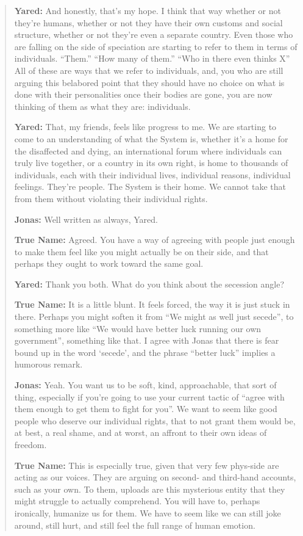 \begin{quote}
\textbf{Yared:} And honestly, that's my hope. I think that way whether or not they're humans, whether or not they have their own customs and social structure, whether or not they're even a separate country. Even those who are falling on the side of speciation are starting to refer to them in terms of individuals. ``Them.'' ``How many of them.'' ``Who in there even thinks X'' All of these are ways that we refer to individuals, and, you who are still arguing this belabored point that they should have no choice on what is done with their personalities once their bodies are gone, you are now thinking of them as what they are: individuals.

\textbf{Yared:} That, my friends, feels like progress to me. We are starting to come to an understanding of what the System is, whether it's a home for the disaffected and dying, an international forum where individuals can truly live together, or a country in its own right, is home to thousands of individuals, each with their individual lives, individual reasons, individual feelings. They're people. The System is their home. We cannot take that from them without violating their individual rights.

\textbf{Jonas:} Well written as always, Yared.

\textbf{True Name:} Agreed. You have a way of agreeing with people just enough to make them feel like you might actually be on their side, and that perhaps they ought to work toward the same goal.

\textbf{Yared:} Thank you both. What do you think about the secession angle?

\textbf{True Name:} It is a little blunt. It feels forced, the way it is just stuck in there. Perhaps you might soften it from ``We might as well just secede'', to something more like ``We would have better luck running our own government'', something like that. I agree with Jonas that there is fear bound up in the word `secede', and the phrase ``better luck'' implies a humorous remark.

\textbf{Jonas:} Yeah. You want us to be soft, kind, approachable, that sort of thing, especially if you're going to use your current tactic of ``agree with them enough to get them to fight for you''. We want to seem like good people who deserve our individual rights, that to not grant them would be, at best, a real shame, and at worst, an affront to their own ideas of freedom.

\textbf{True Name:} This is especially true, given that very few phys-side are acting as our voices. They are arguing on second- and third-hand accounts, such as your own. To them, uploads are this mysterious entity that they might struggle to actually comprehend. You will have to, perhaps ironically, humanize us for them. We have to seem like we can still joke around, still hurt, and still feel the full range of human emotion.


\end{quote}
